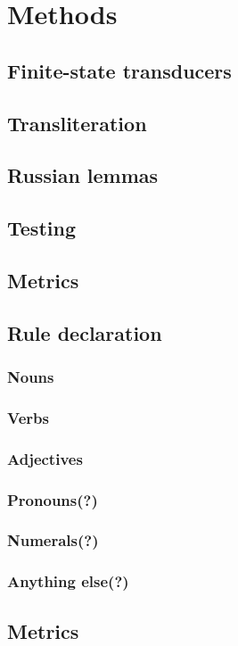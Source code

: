 \section{Methods}

\subsection{Finite-state transducers }
\subsection{Transliteration}
\subsection{Russian lemmas }
\subsection{Testing}
\subsection{Metrics}
\subsection{Rule declaration }
\subsubsection{Nouns}
\subsubsection{Verbs}
\subsubsection{Adjectives}
\subsubsection{Pronouns(?)}
\subsubsection{Numerals(?)}
\subsubsection{Anything else(?)}

\subsection{Metrics}